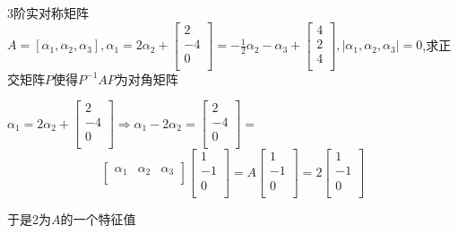 \documentclass[lang=cn,10pt]{elegantbook}
\begin{document}
\begin{example}
	3阶实对称矩阵$A=[\alpha_{1},\alpha_{2},\alpha_{3}],\alpha _1=2\alpha _2+\left[ \begin{array}{c}
		2\\
		-4\\
		0\\
	\end{array} \right] =-\frac{1}{2}\alpha _2-\alpha _3+\left[ \begin{array}{c}
	4\\
	2\\
	4\\
	\end{array} \right] ,|\alpha_{1},\alpha_{2},\alpha_{3}|=0$,求正交矩阵$P$使得$P^{-1}AP$为对角矩阵
\end{example}
\begin{solution}
	
	$\alpha _1=2\alpha _2+\left[ \begin{array}{c}
		2\\
		-4\\
		0\\
	\end{array} \right]\Rightarrow\alpha _1-2\alpha _2=\left[ \begin{array}{c}
		2\\
		-4\\
		0\\
	\end{array} \right]=$
	\begin{equation*}
		\left[ \begin{matrix}
			\alpha _1&		\alpha _2&		\alpha _3\\
		\end{matrix} \right] \left[ \begin{array}{c}
			1\\
			-1\\
			0\\
		\end{array} \right] =A\left[ \begin{array}{c}
			1\\
			-1\\
			0\\
		\end{array} \right] =2\left[ \begin{array}{c}
			1\\
			-1\\
			0\\
		\end{array} \right] 
	\end{equation*}
	
	于是2为$A$的一个特征值
\end{solution}
\end{document}
